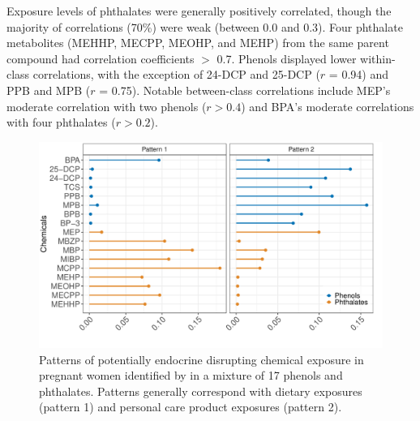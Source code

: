 Exposure levels of phthalates were generally positively correlated, though the majority of correlations (70\%) were weak (between 0.0 and 0.3). Four phthalate metabolites (MEHHP, MECPP, MEOHP, and MEHP) from the same parent compound had correlation coefficients $>$ 0.7. Phenols displayed lower within-class correlations, with the exception of 24-DCP and 25-DCP ($r$ = 0.94) and PPB and MPB ($r$ = 0.75). Notable between-class correlations include MEP's moderate correlation with two phenols ($r > 0.4$) and BPA's moderate correlations with four phthalates ($r > 0.2$).

\begin{landscape}
\begin{figure}
\centering
\includegraphics[scale = 0.55]{./figures/mn2_edc_loadings_flip.pdf}
\caption[Patterns of EDC exposure in Mothers and Newborns cohort]{Patterns of potentially endocrine disrupting chemical exposure in pregnant women identified by \bnmf in a mixture of 17 phenols and phthalates. Patterns generally correspond with dietary exposures (pattern 1) and personal care product exposures (pattern 2).}
\label{fig:patterns}
\end{figure}
\end{landscape}

